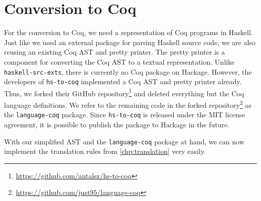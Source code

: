 \section{Conversion to Coq} \label{sec:implementation:coq-ast}
For the conversion to Coq, we need a representation of Coq programs in Haskell.
Just like we used an external package for parsing Haskell source code, we are also reusing an existing Coq AST and pretty printer.
The pretty printer is a component for converting the Coq AST to a textual representation.
Unlike \texttt{haskell-src-exts}, there is currently no Coq package on Hackage.
However, the developers of \texttt{hs-to-coq} implemented a Coq AST and pretty printer already.
Thus, we forked their GitHub repository\footnote{\url{https://github.com/antalsz/hs-to-coq}} and deleted everything but the Coq language definitions.
We refer to the remaining code in the forked repository\footnote{\url{https://github.com/just95/language-coq}} as the \texttt{language-coq} package.
Since \texttt{hs-to-coq} is released under the MIT license agreement, it is possible to publish the package to Hackage in the future.

With our simplified AST and the \texttt{language-coq} package at hand, we can now implement the translation rules from \autoref{chp:translation} very easily.

